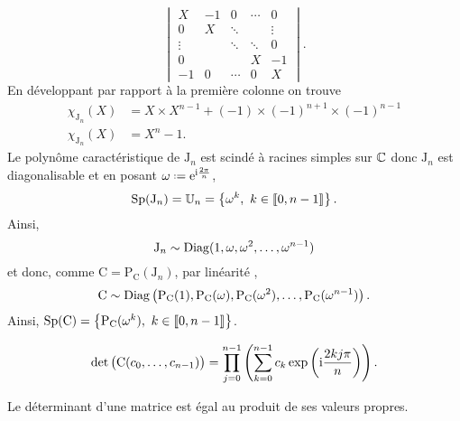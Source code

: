 \begin{preuve}
$$        \begin{vmatrix}
        X & -1 & 0 & \cdots & 0 \\
        0 & X & \ddots & & \vdots \\
        \vdots & & \ddots & \ddots & 0 \\
        0 & & & X & -1 \\
        -1 & 0 & \cdots & 0 & X
        \end{vmatrix}.
    $$
    En développant par rapport à la première colonne on trouve
    \begin{align*}
        \chi_{\mathrm{J}_n}(X) &= X \times X^{n-1} + (-1) \times (-1)^{n+1} \times (-1)^{n-1} \\
        \chi_{\mathrm{J}_n}(X) &= X^n-1.
    \end{align*}
    Le polynôme caractéristique de $\mathrm{J}_n$ est scindé à racines simples sur $\mathbb{C}$ donc $\mathrm{J}_n$ est diagonalisable et en posant $\omega \defeq \me^{\mi \frac{2 \pi}{n}}$, 
    $$\mathrm{Sp}(\mathrm{J}_n) = \mathbb{U}_n = \left \{ \omega^k,\ k \in \llbracket 0, n-1 \rrbracket \right \}.$$
    Ainsi, 
    $$\mathrm{J}_n \sim \mathrm{Diag}(1, \omega, \omega^2, \dots, \omega^{n-1})$$
    et donc, comme $\mathrm{C} = \mathrm{P}_{\mathrm{C}}(\mathrm{J}_n)$, par linéarité \note, 
    $$\mathrm{C} \sim \mathrm{Diag} \left(\mathrm{P}_\mathrm{C}(1), \mathrm{P}_\mathrm{C}(\omega), \mathrm{P}_\mathrm{C}(\omega^2), \dots,\mathrm{P}_\mathrm{C}(\omega^{n-1}) \right).$$
    Ainsi, $\mathrm{Sp}(\mathrm{C}) = \left \{ \mathrm{P}_\mathrm{C}(\omega^k),\ k \in \llbracket 0, n-1 \rrbracket \right \}$.
\end{preuve}    


\begin{corol}
    $$\det \big( \mathrm{C}(c_0, \dots, c_{n-1}) \big) = \prod_{j=0}^{n-1} \left( \sum_{k=0}^{n-1} c_k \exp \left( \mathrm{i} \frac{2kj \pi}{n} \right) \right).$$
\end{corol}

\begin{preuve}
    Le déterminant d'une matrice est égal au produit de ses valeurs propres.
\end{preuve}


